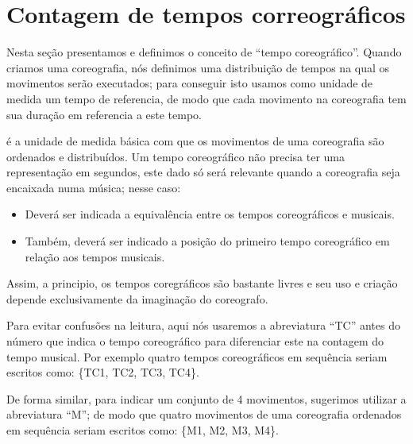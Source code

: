 
\section{Contagem de tempos correográficos}
\label{sec:TemposCoreograficos}
Nesta seção presentamos e definimos o conceito de ``tempo coreográfico''.
Quando criamos uma coreografia, nós 
definimos uma distribuição de tempos na qual os movimentos serão executados;
para conseguir isto usamos como unidade de medida um tempo de referencia,
de modo que cada movimento na coreografia tem sua duração em referencia a este tempo.
\begin{definition} 
\label{def:tempocoreografico}
é a unidade de medida básica com que os movimentos de uma coreografia são ordenados e distribuídos.
Um tempo coreográfico não precisa ter uma representação em segundos,
este dado só será relevante quando a coreografia seja encaixada numa música;
nesse caso: 
\begin{itemize}
\item Deverá ser indicada a equivalência entre os tempos coreográficos e musicais.
\item Também, deverá ser indicado a posição do primeiro tempo coreográfico em relação aos tempos musicais.
\end{itemize}
\end{definition}
Assim, a principio, os tempos coregráficos são bastante livres 
e seu uso e criação depende exclusivamente da imaginação do coreografo.


Para evitar confusões na leitura, aqui nós usaremos a abreviatura ``TC'' 
antes do número que indica o tempo coreográfico 
para diferenciar este na contagem do tempo musical.
Por exemplo quatro tempos coreográficos em sequência seriam escritos como: 
\{TC1, TC2, TC3, TC4\}.

De forma similar, para indicar um conjunto de 4 movimentos, 
sugerimos utilizar a abreviatura ``M''; de modo que quatro movimentos de uma coreografia 
ordenados em sequência seriam escritos como: 
\{M1, M2, M3, M4\}.

